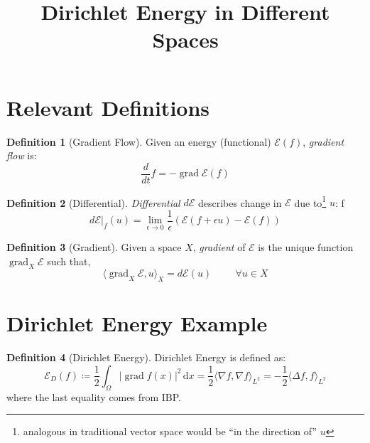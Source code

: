 \documentclass[a4paper]{article}
\title{Dirichlet Energy in Different Spaces}
\author{ }
\newcommand{\dx}{\, \text{d} x}
\theoremstyle{definition}
\newtheorem{definition}{Definition}
\DeclareMathOperator{\grad}{grad}
\begin{document}
\maketitle
\section{Relevant Definitions}
\begin{definition}[Gradient Flow]
    Given an energy (functional) $\mathcal{E}(f)$, \emph{gradient flow} is:
    \begin{equation}
        \frac{d}{dt}f = - \grad \mathcal{E}(f)
        \label{equ: Gradient Flow}
    \end{equation}
\end{definition}

\begin{definition}[Differential]
    \emph{Differential} $d\mathcal{E}$ describes change in $\mathcal{E}$ due to\footnote{analogous in traditional vector space would be ``in the direction of'' $u$} $u$:
 f  \begin{equation}
        d \mathcal{E}|_f(u) = \lim_{\epsilon \rightarrow 0} \frac{1}{\epsilon} \left( \mathcal{E}(f+\epsilon u) - \mathcal{E}(f) \right)
        \label{equ: Differential}
    \end{equation}
\end{definition}

\begin{definition}[Gradient]
    Given a space $X$, \emph{gradient} of $\mathcal{E}$ is the unique function $\grad_X \mathcal{E}$ such that,
    \begin{equation}
        \langle \grad_X \mathcal{E}, u \rangle_X = d \mathcal{E}(u) \hspace{1cm} \forall u \in X
        \label{equ: Gradient}
    \end{equation}
\end{definition}

\section{Dirichlet Energy Example}

\begin{definition}[Dirichlet Energy]
    Dirichlet Energy is defined as:
    \begin{equation}
        \mathcal{E}_D(f) \coloneqq \frac{1}{2} \int_{\Omega} |\grad f(x)|^2 \dx
        = \frac{1}{2} \langle \nabla f, \nabla f \rangle_{L^2}
        = -\frac{1}{2} \langle \Delta f, f \rangle_{L^2}
        \label{equ: Dirichlet Energy}
    \end{equation}
    where the last equality comes from IBP.
\end{definition}
\end{document}
